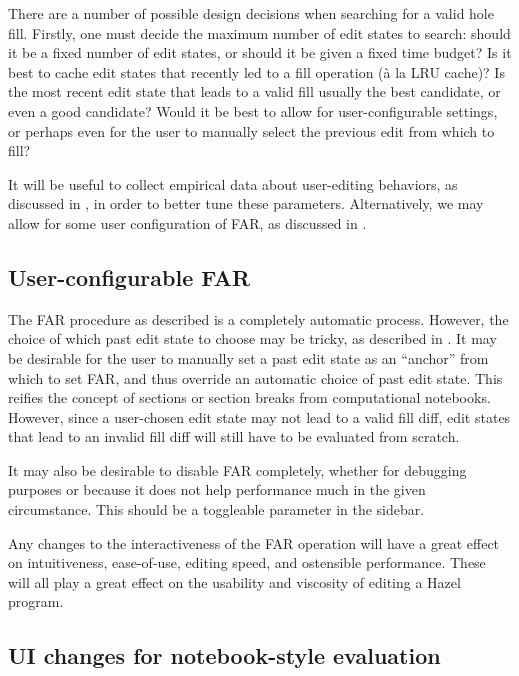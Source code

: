 There are a number of possible design decisions when searching for a valid hole fill. Firstly, one must decide the maximum number of edit states to search: should it be a fixed number of edit states, or should it be given a fixed time budget? Is it best to cache edit states that recently led to a fill operation (\`a la LRU cache)? Is the most recent edit state that leads to a valid fill usually the best candidate, or even a good candidate? Would it be best to allow for user-configurable settings, or perhaps even for the user to manually select the previous edit from which to fill?

It will be useful to collect empirical data about user-editing behaviors, as discussed in , in order to better tune these parameters. Alternatively, we may allow for some user configuration of FAR, as discussed in .

\subsection{User-configurable FAR}
\label{sec:far-improv-user-config}

The FAR procedure as described is a completely automatic process. However, the choice of which past edit state to choose may be tricky, as described in . It may be desirable for the user to manually set a past edit state as an ``anchor'' from which to set FAR, and thus override an automatic choice of past edit state. This reifies the concept of sections or section breaks from computational notebooks. However, since a user-chosen edit state may not lead to a valid fill diff, edit states that lead to an invalid fill diff will still have to be evaluated from scratch.

It may also be desirable to disable FAR completely, whether for debugging purposes or because it does not help performance much in the given circumstance. This should be a toggleable parameter in the sidebar.

Any changes to the interactiveness of the FAR operation will have a great effect on intuitiveness, ease-of-use, editing speed, and ostensible performance. These will all play a great effect on the usability and viscosity of editing a Hazel program.

\subsection{UI changes for notebook-style evaluation}
\label{sec:far-improv-notebook-ui}

